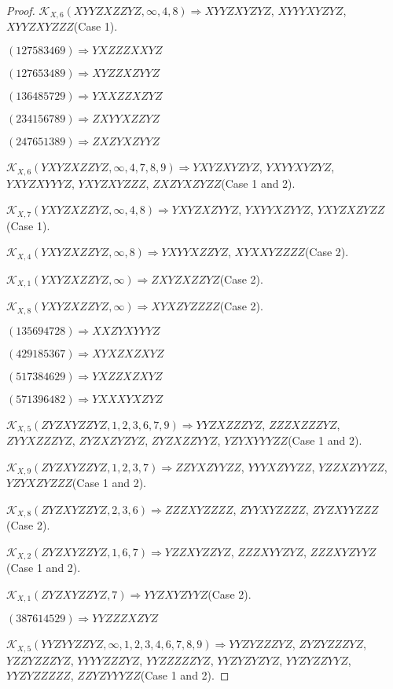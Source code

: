 \documentclass[12pt]{article}
\theoremstyle{plain}
\theoremstyle{definition}
\theoremstyle{remark}
\newcommand{\fancy}[1]{\mathcal{#1}}
\def\K{\fancy{K}}
\begin{document}
\begin{proof}
	$\K_{X,6}(XYYZXZZYZ,\infty,4, 8)\Rightarrow $$XYYZXYZYZ$, $XYYYXYZYZ$, $XYYZXYZZZ$(Case 1).
	
	
	
	$(1 2 7 5 8 3 4 6 9)\Rightarrow YXZZZXXYZ$
	
	$(1 2 7 6 5 3 4 8 9)\Rightarrow XYZZXZYYZ$
	
	$(1 3 6 4 8 5 7 2 9)\Rightarrow YXXZZXZYZ$
	
	$(2 3 4 1 5 6 7 8 9)\Rightarrow ZXYYXZZYZ$
	
	$(2 4 7 6 5 1 3 8 9)\Rightarrow ZXZYXZYYZ$
	
	
	
	$\K_{X,6}(YXYZXZZYZ,\infty,4, 7, 8, 9)\Rightarrow $$YXYZXYZYZ$, $YXYYXYZYZ$, $YXYZXYYYZ$, $YXYZXYZZZ$, $ZXZYXZYZZ$(Case 1 and 2).
	
	$\K_{X,7}(YXYZXZZYZ,\infty,4, 8)\Rightarrow $$YXYZXZYYZ$, $YXYYXZYYZ$, $YXYZXZYZZ$(Case 1).
	
	$\K_{X,4}(YXYZXZZYZ,\infty,8)\Rightarrow $$YXYYXZZYZ$, $XYXXYZZZZ$(Case 2).
	
	$\K_{X,1}(YXYZXZZYZ,\infty)\Rightarrow $$ZXYZXZZYZ$(Case 2).
	
	$\K_{X,8}(YXYZXZZYZ,\infty)\Rightarrow $$XYXZYZZZZ$(Case 2).
	
	
	
	$(1 3 5 6 9 4 7 2 8)\Rightarrow XXZYXYYYZ$
	
	$(4 2 9 1 8 5 3 6 7)\Rightarrow XYXZXZXYZ$
	
	$(5 1 7 3 8 4 6 2 9)\Rightarrow YXZZXZXYZ$
	
	$(5 7 1 3 9 6 4 8 2)\Rightarrow YXXXYXZYZ$
	
	
	
	$\K_{X,5}(ZYZXYZZYZ,1, 2, 3, 6, 7, 9)\Rightarrow $$YYZXZZZYZ$, $ZZZXZZZYZ$, $ZYYXZZZYZ$, $ZYZXZYZYZ$, $ZYZXZZYYZ$, $YZYXYYYZZ$(Case 1 and 2).
	
	$\K_{X,9}(ZYZXYZZYZ,1, 2, 3, 7)\Rightarrow $$ZZYXZYYZZ$, $YYYXZYYZZ$, $YZZXZYYZZ$, $YZYXZYZZZ$(Case 1 and 2).
	
	$\K_{X,8}(ZYZXYZZYZ,2, 3, 6)\Rightarrow $$ZZZXYZZZZ$, $ZYYXYZZZZ$, $ZYZXYYZZZ$(Case 2).
	
	$\K_{X,2}(ZYZXYZZYZ,1, 6, 7)\Rightarrow $$YZZXYZZYZ$, $ZZZXYYZYZ$, $ZZZXYZYYZ$(Case 1 and 2).
	
	$\K_{X,1}(ZYZXYZZYZ,7)\Rightarrow $$YYZXYZYYZ$(Case 2).
	
	
	
	$(3 8 7 6 1 4 5 2 9)\Rightarrow YYZZZXZYZ$
	
	
	
	$\K_{X,5}(YYZYYZZYZ,\infty,1, 2, 3, 4, 6, 7, 8, 9)\Rightarrow $$YYZYZZZYZ$, $ZYZYZZZYZ$, $YZZYZZZYZ$, $YYYYZZZYZ$, $YYZZZZZYZ$, $YYZYZYZYZ$, $YYZYZZYYZ$, $YYZYZZZZZ$, $ZZYZYYYZZ$(Case 1 and 2).
	

\end{proof}
\end{document}
